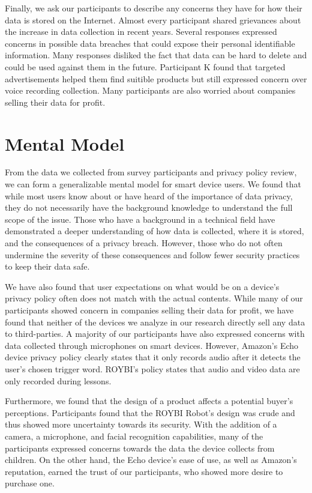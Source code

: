 \documentclass[12pt]{ucthesis}
\begin{document}
Finally, we ask our participants to describe any concerns they have for how their data is stored on the Internet. Almost every participant shared grievances about the increase in data collection in recent years. Several responses expressed concerns in possible data breaches that could expose their personal identifiable information. Many responses disliked the fact that data can be hard to delete and could be used against them in the future. Participant K found that targeted advertisements helped them find suitible products but still expressed concern over voice recording collection. Many participants are also worried about companies selling their data for profit.

\section{Mental Model}
From the data we collected from survey participants and privacy policy review, we can form a generalizable mental model for smart device users. We found that while most users know about or have heard of the importance of data privacy, they do not necessarily have the background knowledge to understand the full scope of the issue. Those who have a background in a technical field have demonstrated a deeper understanding of how data is collected, where it is stored, and the consequences of a privacy breach. However, those who do not often undermine the severity of these consequences and follow fewer security practices to keep their data safe.

We have also found that user expectations on what would be on a device's privacy policy often does not match with the actual contents. While many of our participants showed concern in companies selling their data for profit, we have found that neither of the devices we analyze in our research directly sell any data to third-parties. A majority of our participants have also expressed concerns with data collected through microphones on smart devices. However, Amazon's Echo device privacy policy clearly states that it only records audio after it detects the user's chosen trigger word. ROYBI's policy states that audio and video data are only recorded during lessons.

Furthermore, we found that the design of a product affects a potential buyer's perceptions. Participants found that the ROYBI Robot's design was crude and thus showed more uncertainty towards its security. With the addition of a camera, a microphone, and facial recognition capabilities, many of the participants expressed concerns towards the data the device collects from children. On the other hand, the Echo device's ease of use, as well as Amazon's reputation, earned the trust of our participants, who showed more desire to purchase one.
\end{document}
